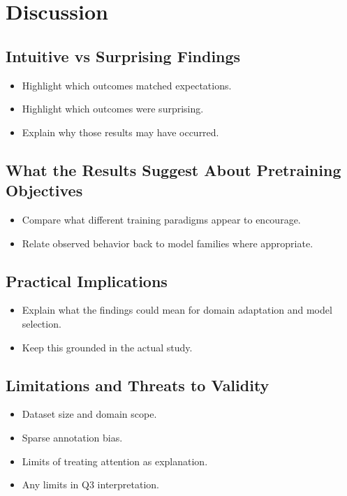 \documentclass[11pt]{article}
\begin{document}
\section{Discussion}

\subsection{Intuitive vs Surprising Findings}

\begin{itemize}[leftmargin=1.5em]
    \item Highlight which outcomes matched expectations.
    \item Highlight which outcomes were surprising.
    \item Explain why those results may have occurred.
\end{itemize}

\subsection{What the Results Suggest About Pretraining Objectives}

\begin{itemize}[leftmargin=1.5em]
    \item Compare what different training paradigms appear to encourage.
    \item Relate observed behavior back to model families where appropriate.
\end{itemize}

\subsection{Practical Implications}

\begin{itemize}[leftmargin=1.5em]
    \item Explain what the findings could mean for domain adaptation and model
    selection.
    \item Keep this grounded in the actual study.
\end{itemize}

\subsection{Limitations and Threats to Validity}

\begin{itemize}[leftmargin=1.5em]
    \item Dataset size and domain scope.
    \item Sparse annotation bias.
    \item Limits of treating attention as explanation.
    \item Any limits in Q3 interpretation.
\end{itemize}
\end{document}
